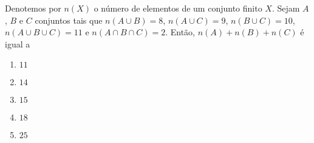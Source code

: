 \item %
		Denotemos por $n(X)$ o número de elementos de um conjunto finito $X$. Sejam $A$, $B$ e $C$ conjuntos tais que
$n(A \cup B)= 8$, $n(A \cup C)= 9$, $n(B \cup C)= 10$, $n(A \cup B \cup C) = 11$ e $n (A \cap B \cap C) = 2$.
Então, $n(A) + n(B) + n(C)$ é igual a
\begin{multicols}{5}
\begin{enumerate}
\item $ 11$
\item $ 14$
\item $ 15$
\item $ 18$ %
\item $ 25$
\end{enumerate}
\end{multicols}
